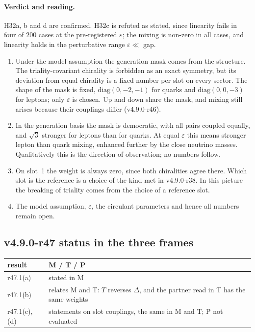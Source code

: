 \paragraph{Verdict and reading.}
H32a, b and d are confirmed.  H32c is refuted as stated, since linearity fails in four of \(200\) cases at the pre-registered \(\varepsilon\); the
mixing is non-zero in all cases, and linearity holds in the perturbative range \(\varepsilon\ll\) gap.
\begin{enumerate}[leftmargin=2em]
\item Under the model assumption the generation mask comes from the structure.  The triality-covariant chirality is forbidden as an exact
symmetry, but its deviation from equal chirality is a fixed number per slot on every sector.  The shape of the mask is fixed,
\(\mathrm{diag}(0,-2,-1)\) for quarks and \(\mathrm{diag}(0,0,-3)\) for leptons; only \(\varepsilon\) is chosen.  Up and down share the mask, and
mixing still arises because their couplings differ (v4.9.0-r46).
\item In the generation basis the mask is democratic, with all pairs coupled equally, and \(\sqrt3\) stronger for leptons than for quarks.  At
equal \(\varepsilon\) this means stronger lepton than quark mixing, enhanced further by the close neutrino masses.  Qualitatively this is the
direction of observation; no numbers follow.
\item On slot~1 the weight is always zero, since both chiralities agree there.  Which slot is the reference is a choice of the kind met in
v4.9.0-r38.  In this picture the breaking of triality comes from the choice of a reference slot.
\item The model assumption, \(\varepsilon\), the circulant parameters and hence all numbers remain open.
\end{enumerate}

\subsection*{v4.9.0-r47 status in the three frames}
\label{subsec:v490-r47-frames}

\begin{center}
\small
\begin{tabular}{@{}>{\raggedright\arraybackslash}p{}>{\raggedright\arraybackslash}p{}@{}}
\toprule
result & M / T / P\\
\midrule
r47.1(a) & stated in M\\
r47.1(b) & relates M and T: \(T\) reverses \(\Delta\), and the partner read in T has the same weights\\
r47.1(c), (d) & statements on slot couplings, the same in M and T; P not evaluated\\
\bottomrule
\end{tabular}
\end{center}

